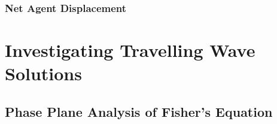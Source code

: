 \documentclass[11pt,a4paper]{article}
\begin{document}
		\subsubsection{Net Agent Displacement}
			\label{subs:netagentdisplacement}
			
			
		
	


\section{Investigating Travelling Wave Solutions}
	\label{sec:investigatingfishersequation}
	
	\subsection{Phase Plane Analysis of Fisher's Equation}
		\label{sub:phaseplaneanalysisoffishersequation}
		
\end{document}
